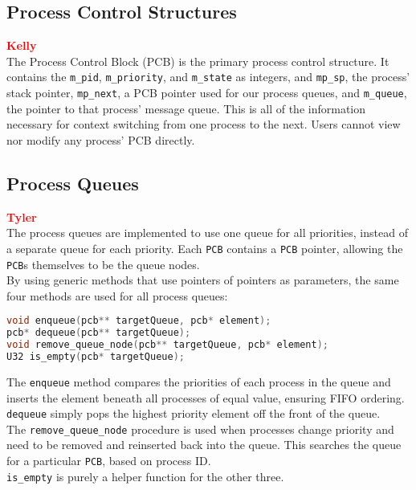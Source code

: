\documentclass[12pt]{report}
\begin{document}
\subsection{Process Control Structures}

\textcolor{red}{\textbf{Kelly}} \\
The Process Control Block (PCB) is the primary process control structure. It
contains the \texttt{m_pid}, \texttt{m_priority}, and \texttt{m_state} as integers, and 
\texttt{mp_sp}, the process' stack pointer, \texttt{mp_next}, a PCB pointer used for our
process queues, and \texttt{m_queue}, the pointer to that process' message queue.
This is all of the information necessary for context switching from one process
to the next. Users cannot view nor modify any process' PCB directly.

\subsection{Process Queues}

\textcolor{red}{\textbf{Tyler}} \\
The process queues are implemented to use one queue for all priorities, instead of a separate queue for each priority. Each {\tt PCB} contains a {\tt PCB} pointer, allowing the {\tt PCB}s themselves to be the queue nodes. \\
By using generic methods that use pointers of pointers as parameters, the same four methods are used for all process queues: \\
\begin{minipage}{\textwidth}
\begin{lstlisting}[language=C, frame=single]
void enqueue(pcb** targetQueue, pcb* element);
pcb* dequeue(pcb** targetQueue);
void remove_queue_node(pcb** targetQueue, pcb* element);
U32 is_empty(pcb* targetQueue);
\end{lstlisting}
\end{minipage}
The {\tt enqueue} method compares the priorities of each process in the queue and inserts the element beneath all processes of equal value, ensuring FIFO ordering.\\
{\tt dequeue} simply pops the highest priority element off the front of the queue.\\
The {\tt remove_queue_node} procedure is used when processes change priority and need to be removed and reinserted back into the queue. This searches the queue for a particular {\tt PCB}, based on process ID.\\
{\tt is_empty} is purely a helper function for the other three.\\
\end{document}
